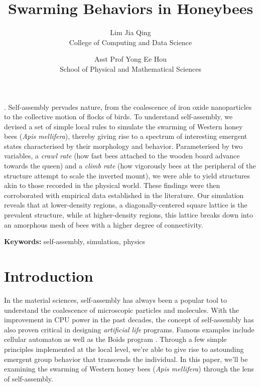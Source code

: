 \documentclass[a4paper,10pt]{article}
\title{Swarming Behaviors in Honeybees}
\date{}
\author{
    {Lim Jia Qing} \\
    College of Computing and Data Science  \\
    \and
    {Asst Prof Yong Ee Hou} \\
    School of Physical and Mathematical Sciences \\
}
\renewenvironment{abstract}{
    \small
\noindent\textbf{\textit{\abstractname}}.\hspace{1em}} %
{}
\begin{document}
\maketitle

\begin{multicols}{2}

    \begin{abstract}
        Self-assembly pervades nature, from the coalescence of iron oxide nanoparticles
        to the collective motion of flocks of birds. To understand self-assembly, we
        devised a set of simple local rules to simulate the swarming of Western
        honey bees (\textit{Apis mellifera}), thereby giving rise to a spectrum of
        interesting emergent states characterised by their morphology and behavior.
        Parameterised by two variables, a \textit{crawl rate} (how fast bees attached
        to the wooden board advance towards the queen) and a \textit{climb rate} (how
        vigorously bees at the peripheral of the structure attempt to scale the inverted
        mount), we were able to yield structures akin to those recorded in the
        physical world. These findings were then corroborated with empirical data established
        in the literature. Our simulation reveals that at lower-density
        regions, a diagonally-centered square lattice is the prevalent structure, while
        at higher-density regions, this lattice breaks down into an amorphous mesh
        of bees with a higher degree of connectivity.
    \end{abstract}

    \textbf{Keywords:} self-assembly, simulation, physics

    \section{Introduction}

    In the material sciences, self-assembly has always been a popular tool to understand the
    coalescence of microscopic particles and molecules. With the improvement in CPU power in the past
    decades, the concept of self-assembly has also proven critical in designing \textit{artificial life}
    programs. Famous examples include cellular automaton \cite{fetecau2012mathematical} as well as
    the Boids program \cite{reynolds1987flocks}. Through a few simple principles implemented at
    the local level, we're able to give rise to astounding emergent group behavior that transcends
    the individual. In this paper, we'll be examining the swarming of Western honey bees
    (\textit{Apis mellifera}) through the lens of self-assembly.


\end{multicols}
\end{document}
